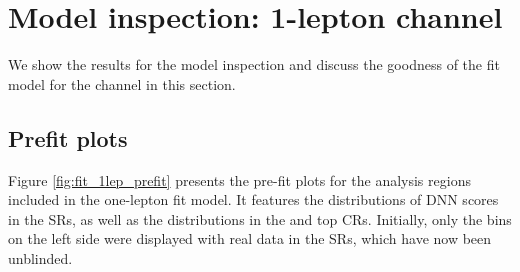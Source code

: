 \clearpage
\section{Model inspection: 1-lepton channel}
\label{sec:fit_1lep}

We show the results for the model inspection and discuss the goodness of the fit model for the \olep channel
in this section.

\subsection{Prefit plots}


Figure \ref{fig:fit_1lep_prefit} presents the pre-fit plots for the analysis regions included in the one-lepton fit model. 
It features the distributions of DNN scores in the SRs, as well as the \mjjtag distributions in the \Wjets and top CRs. 
Initially, only the bins on the left side were displayed with real data in the SRs, which have now been unblinded.

